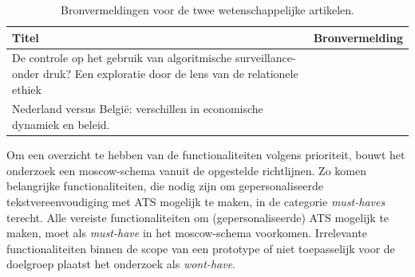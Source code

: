 \begin{center}
	\begin{table}[H]
		\begin{tabular}{ | m{10cm} | m{5cm} | } 
			\hline
			\textbf{Titel} & \textbf{Bronvermelding} \\
			\hline
			De controle op het gebruik van algoritmische surveillance- onder druk? Een exploratie door de lens van de relationele ethiek & \autocite{VanBrakel2022} \\
			\hline
			Nederland versus België: verschillen in economische dynamiek en beleid. & \autocite{Sleuwaegen2022} \\
			\hline
		\end{tabular}
		\caption{Bronvermeldingen voor de twee wetenschappelijke artikelen.}
		\label{table:referentieteksten-bronvermelding}
	\end{table}
\end{center}

Om een overzicht te hebben van de functionaliteiten volgens prioriteit, bouwt het onderzoek een moscow-schema vanuit de opgestelde richtlijnen. Zo komen belangrijke functionaliteiten, die nodig zijn om gepersonaliseerde tekstvereenvoudiging met ATS mogelijk te maken, in de categorie \textit{must-haves} terecht. Alle vereiste functionaliteiten om (gepersonaliseerde) ATS mogelijk te maken, moet als \textit{must-have} in het moscow-schema voorkomen. Irrelevante functionaliteiten binnen de scope van een prototype of niet toepasselijk voor de doelgroep plaatst het onderzoek als \textit{wont-have}.

